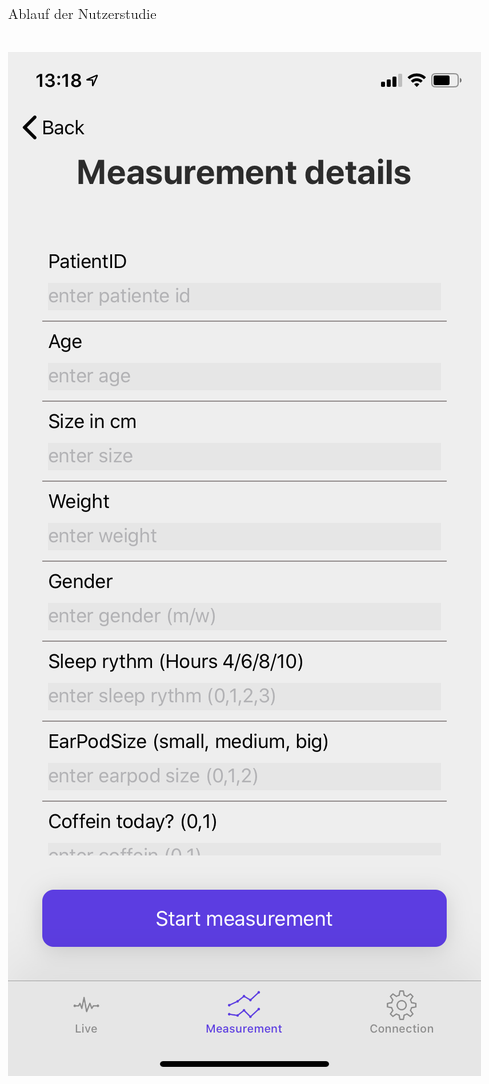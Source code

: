 \documentclass[18pt]{beamer}
\begin{document}
\begin{frame}{Ablauf der Nutzerstudie}
\begin{center}
\begin{columns}[T]
\begin{column}{.33\textwidth}
                \centering
                \includegraphics[scale=0.1]{images/app/measurement_details.PNG}
            \end{column}%
            \hfill%
            \begin{column}{.33\textwidth}

\end{column}
\end{columns}
\end{center}
\end{frame}
\end{document}
